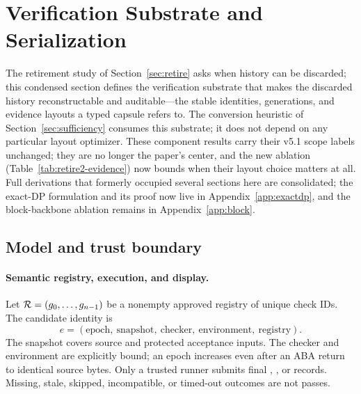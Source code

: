 \section{Verification Substrate and Serialization}\label{sec:substrate}
The retirement study of Section~\ref{sec:retire} asks when history can
be discarded; this condensed section defines the verification
substrate that makes the discarded history reconstructable and
auditable---the stable identities, generations, and evidence layouts a
typed capsule refers to. The conversion heuristic of
Section~\ref{sec:sufficiency} consumes this substrate; it does not
depend on any particular layout optimizer. These component results
carry their v5.1 scope labels unchanged; they are no longer the
paper's center, and the new ablation (Table~\ref{tab:retire2-evidence})
now bounds when their layout choice matters at all. Full derivations
that formerly occupied several sections here are consolidated; the
exact-DP formulation and its proof now live in
Appendix~\ref{app:exactdp}, and the block-backbone ablation remains in
Appendix~\ref{app:block}.

\subsection{Model and trust boundary}\label{sec:model}
\paragraph{Semantic registry, execution, and display.}\label{sec:registry}
Let $\mathcal R=(g_0,\ldots,g_{n-1})$ be a nonempty approved registry of unique check
IDs. The candidate identity is
\begin{equation}e=( \text{epoch},\ \text{snapshot},\ \text{checker},\ \text{environment},\ \text{registry}).\end{equation}
The snapshot covers source and protected acceptance inputs. The checker and
environment are explicitly bound; an epoch increases even after an ABA return to
identical source bytes. Only a trusted runner submits final \PASS{}, \FAIL{}, or
\UNKNOWN{} records. Missing, stale, skipped, incompatible, or timed-out outcomes
are not passes.

